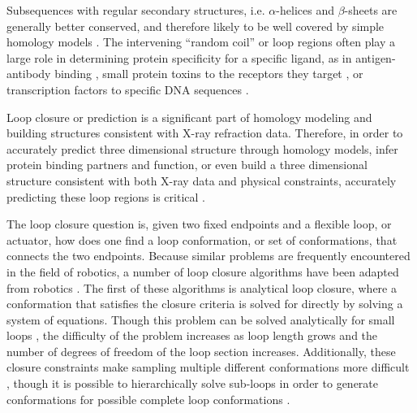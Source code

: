 Subsequences with regular secondary structures, i.e. $\alpha$-helices and $\beta$-sheets are generally better conserved, and therefore likely to be well covered by simple homology models \cite{kolodny2005inverse,petrey2003using}.
The intervening ``random coil'' or loop regions often play a large role in determining protein specificity for a specific ligand, as in antigen-antibody binding \cite{bajorath1996comparison}, small protein toxins to the receptors they target \cite{wu1996functional}, or transcription factors to specific DNA sequences \cite{jones1999protein}.

Loop closure or prediction is a significant part of homology modeling \cite{petrey2003using} and building structures consistent with X-ray refraction data.
Therefore, in order to accurately predict three dimensional structure through homology models, infer protein binding partners and function, or even build a three dimensional structure consistent with both X-ray data and physical constraints, accurately predicting these loop regions is critical \cite{fiser2000modeling}.

The loop closure question is, given two fixed endpoints and a flexible loop, or actuator, how does one find a loop conformation, or set of conformations, that connects the two endpoints.
Because similar problems are frequently encountered in the field of robotics, a number of loop closure algorithms have been adapted from robotics \cite{kolodny2005inverse}.
The first of these algorithms is analytical loop closure, where a conformation that satisfies the closure criteria is solved for directly by solving a system of equations.
Though this problem can be solved analytically for small loops \cite{wedemeyer1999exact,go1970ring,bruccoleri1985chain,palmer1991standard}, the difficulty of the problem increases as loop length grows and the number of degrees of freedom of the loop section increases.
Additionally, these closure constraints make sampling multiple different conformations more difficult \cite{cortes2005sampling}, though it is possible to hierarchically solve sub-loops in order to generate conformations for possible complete loop conformations \cite{wedemeyer1999exact}.
